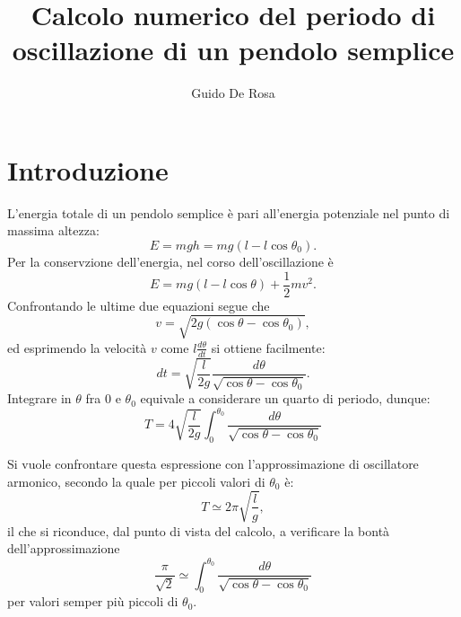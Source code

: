 \documentclass[a4paper]{article}
\author{Guido De Rosa}
\begin{document}
\title{Calcolo numerico del periodo di oscillazione di un pendolo semplice}

\maketitle

\section{Introduzione}

L'energia totale di un pendolo semplice è pari all'energia potenziale
nel punto di massima altezza:
\begin{equation*}
  E = mgh = mg(l - l\cos{\theta_0}) .
\end{equation*}
Per la conservzione dell'energia, nel corso dell'oscillazione è 
\[
  E = mg(l - l\cos{\theta}) + \frac{1}{2}mv^2 . 
\]
Confrontando le ultime due equazioni segue che
\[
  v = \sqrt{2g(\cos{\theta} - \cos{\theta_0})} ,
\] 
ed esprimendo la velocità $v$ come $l\frac{d\theta}{dt}$ si ottiene facilmente:
\[
  dt = \sqrt{\frac{l}{2g}}\frac{d\theta}{\sqrt{\cos{\theta} - \cos{\theta_0} }} .
\]
Integrare in $\theta$ fra $0$ e $\theta_0$ equivale a considerare un quarto di periodo, 
dunque:
\[
  T = 4 \sqrt{\frac{l}{2g}} \int_{0}^{\theta_0}\frac{d\theta}{\sqrt{\cos{\theta}-\cos{\theta_0}}}
\]

Si vuole confrontare questa espressione con l'approssimazione di oscillatore armonico, 
secondo la quale per piccoli valori di $\theta_0$ è:
\[
  T \simeq 2\pi \sqrt{\frac{l}{g}} ,
\]
il che si riconduce, dal punto di vista del calcolo, a verificare la bontà 
dell'approssimazione
\[
  \frac{\pi}{\sqrt{2}} \simeq \int_{0}^{\theta_0}\frac{d\theta}{\sqrt{\cos{\theta}-\cos{\theta_0}}}
\]
per valori semper più piccoli di $\theta_0$.
\end{document}
